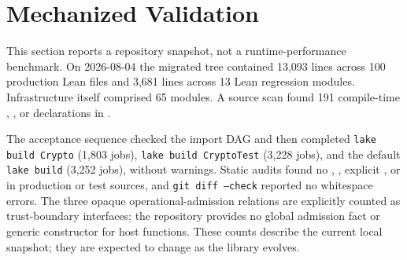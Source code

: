 \section{Mechanized Validation}
\label{sec:evaluation}

This section reports a repository snapshot, not a runtime-performance
benchmark.  On 2026-08-04 the migrated tree contained 13,093 lines across 100
production Lean files and 3,681 lines across 13 Lean regression modules.
Infrastructure itself comprised 65 modules.  A source scan found 191
compile-time , , or  declarations in
.

The acceptance sequence checked the import DAG and then completed
\texttt{lake build Crypto} (1,803 jobs), \texttt{lake build CryptoTest} (3,228
jobs), and the default \texttt{lake build} (3,252 jobs), without warnings.  Static
audits found no , , explicit , or
 in production or test sources, and \texttt{git diff --check}
reported no whitespace errors.  The three opaque operational-admission
relations are explicitly counted as trust-boundary interfaces; the repository
provides no global admission fact or generic constructor for host functions.
These counts describe the current local snapshot; they are expected to change
as the library evolves.


